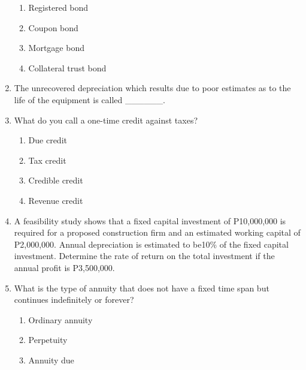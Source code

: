 \documentclass[11pt,a4paper]{article}
\begin{document}
\begin{enumerate}
\begin{enumerate}[label=\Alph*.]
\item{Registered bond}
\item{Coupon bond}
\item{Mortgage bond}
\item{Collateral trust bond}
\end{enumerate}
\item{The unrecovered depreciation which results due to poor estimates as to the life of the equipment is called \_\_\_\_\_\_.}
\\
\item{What do you call a one-time credit against taxes?}
\begin{enumerate}[label=\Alph*.]
\item{Due credit}
\item{Tax credit}
\item{Credible credit}
\item{Revenue credit}
\end{enumerate}
\item{A feasibility study shows that a fixed capital investment of P10,000,000 is required for a proposed construction firm and an estimated working capital of P2,000,000. Annual depreciation is estimated to be10\% of the fixed capital investment. Determine the rate of return on the total investment if the annual profit is P3,500,000.}
\\
\item{What is the type of annuity that does not have a fixed time span but continues indefinitely or forever?}
\begin{enumerate}[label=\Alph*.]
\item{Ordinary annuity}
\item{Perpetuity}
\item{Annuity due}

\end{enumerate}
\end{enumerate}
\end{document}
